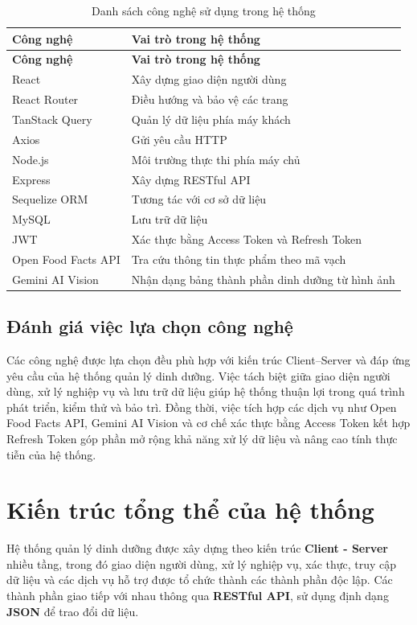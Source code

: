 \documentclass[12pt, a4paper]{report}
\begin{document}
\begin{longtable}{|>{\raggedright\arraybackslash}p{5cm}|p{10cm}|}
\caption{Danh sách công nghệ sử dụng trong hệ thống}
\label{tab:cong_nghe_su_dung} \\
\hline
\textbf{Công nghệ} & \textbf{Vai trò trong hệ thống} \\
\hline
\endfirsthead
\hline
\textbf{Công nghệ} & \textbf{Vai trò trong hệ thống} \\
\hline
\endhead

React & Xây dựng giao diện người dùng \\
\hline
React Router & Điều hướng và bảo vệ các trang \\
\hline
TanStack Query & Quản lý dữ liệu phía máy khách \\
\hline
Axios & Gửi yêu cầu HTTP \\
\hline
Node.js & Môi trường thực thi phía máy chủ \\
\hline
Express & Xây dựng RESTful API \\
\hline
Sequelize ORM & Tương tác với cơ sở dữ liệu \\
\hline
MySQL & Lưu trữ dữ liệu \\
\hline
JWT & Xác thực bằng Access Token và Refresh Token \\
\hline
Open Food Facts API & Tra cứu thông tin thực phẩm theo mã vạch \\
\hline
Gemini AI Vision & Nhận dạng bảng thành phần dinh dưỡng từ hình ảnh \\
\hline
\end{longtable}

\subsection{Đánh giá việc lựa chọn công nghệ}Các công nghệ được lựa chọn đều phù hợp với kiến trúc Client–Server và đáp ứng yêu cầu của hệ thống quản lý dinh dưỡng. Việc tách biệt giữa giao diện người dùng, xử lý nghiệp vụ và lưu trữ dữ liệu giúp hệ thống thuận lợi trong quá trình phát triển, kiểm thử và bảo trì. Đồng thời, việc tích hợp các dịch vụ như Open Food Facts API, Gemini AI Vision và cơ chế xác thực bằng Access Token kết hợp Refresh Token góp phần mở rộng khả năng xử lý dữ liệu và nâng cao tính thực tiễn của hệ thống.

\section{Kiến trúc tổng thể của hệ thống}Hệ thống quản lý dinh dưỡng được xây dựng theo kiến trúc \textbf{Client - Server} nhiều tầng, trong đó giao diện người dùng, xử lý nghiệp vụ, xác thực, truy cập dữ liệu và các dịch vụ hỗ trợ được tổ chức thành các thành phần độc lập. Các thành phần giao tiếp với nhau thông qua \textbf{RESTful API}, sử dụng định dạng \textbf{JSON} để trao đổi dữ liệu.
\end{document}
